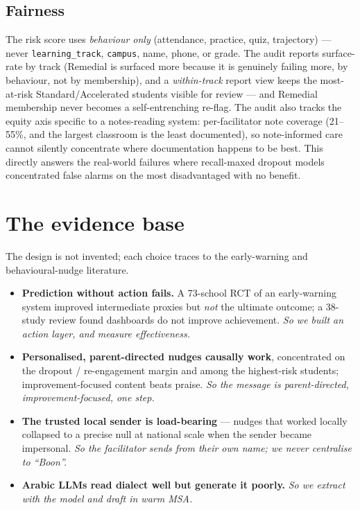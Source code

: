 \documentclass[11pt,paper=a4,parskip=half,DIV=11]{scrartcl}
\begin{document}
\subsection{Fairness}\label{sec:fair}
\begin{why}
The risk score uses \emph{behaviour only} (attendance, practice, quiz, trajectory) --- never
\texttt{learning\_track}, \texttt{campus}, name, phone, or grade. The audit reports surface-rate by track
(Remedial is surfaced more because it is genuinely failing more, by behaviour, not by membership), and a
\emph{within-track} report view keeps the most-at-risk Standard/Accelerated students visible for review
--- and Remedial membership never becomes a self-entrenching re-flag. The audit also tracks the equity
axis specific to a notes-reading system: per-facilitator note coverage (21--55\%, and the largest
classroom is the least documented), so note-informed care cannot silently concentrate where
documentation happens to be best. This directly answers the
real-world failures where recall-maxed dropout models concentrated false alarms on the most
disadvantaged with no benefit.
\end{why}

\section{The evidence base}\label{sec:evidence}
The design is not invented; each choice traces to the early-warning and behavioural-nudge literature.
\begin{itemize}
\item \textbf{Prediction without action fails.} A 73-school RCT of an early-warning system improved
intermediate proxies but \emph{not} the ultimate outcome; a 38-study review found dashboards do not
improve achievement. \emph{So we built an action layer, and measure effectiveness.}
\item \textbf{Personalised, parent-directed nudges causally work}, concentrated on the dropout /
re-engagement margin and among the highest-risk students; improvement-focused content beats praise.
\emph{So the message is parent-directed, improvement-focused, one step.}
\item \textbf{The trusted local sender is load-bearing} --- nudges that worked locally collapsed to a
precise null at national scale when the sender became impersonal. \emph{So the facilitator sends from
their own name; we never centralise to ``Boon''.}
\item \textbf{Arabic LLMs read dialect well but generate it poorly.} \emph{So we extract with the model
and draft in warm MSA.}
\end{itemize}
\end{document}

